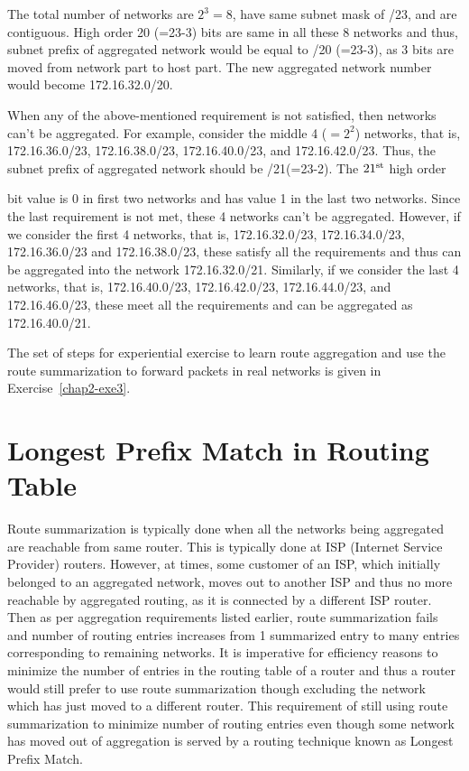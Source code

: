 \begin{multicols}{2}
The total number of networks are $2^{3}=8$, have same subnet mask of /23, and are contiguous. High order 20 (=23-3) bits are same in all these 8 networks and thus, subnet prefix of aggregated network would be equal to /20 (=23-3), as 3 bits are moved from network part to host part. The new aggregated network number would become 172.16.32.0/20.

When any of the above-mentioned requirement is not satisfied, then networks can’t be aggregated. For example, consider the middle 4 ($=2^{2}$) networks, that is, 172.16.36.0/23, 172.16.38.0/23, 172.16.40.0/23, and 172.16.42.0/23. Thus, the subnet prefix of aggregated network should be /21(=23-2). The $21^{\rm st}$ high order

bit value is 0 in first two networks and has value 1 in the last two networks. Since the last requirement is not met, these 4 networks can’t be aggregated. However, if we consider the first 4 networks, that is, 172.16.32.0/23, 172.16.34.0/23, 172.16.36.0/23 and 172.16.38.0/23, these satisfy all the requirements and thus can be aggregated into the network 172.16.32.0/21. Similarly, if we consider the last 4 networks, that is, 172.16.40.0/23, 172.16.42.0/23, 172.16.44.0/23, and 172.16.46.0/23, these meet all the requirements and can be aggregated as 172.16.40.0/21.

The set of steps for experiential exercise to learn route aggregation and use the route summarization to forward packets in real networks is given in Exercise~\ref{chap2-exe3}.

\section{Longest Prefix Match in Routing Table}\label{chap2-sec6}

Route summarization is typically done when all the networks being aggregated are reachable from same router. This is typically done at ISP (Internet Service Provider) routers. However, at times, some customer of an ISP, which initially belonged to an aggregated network, moves out to another ISP and thus no more reachable by aggregated routing, as it is connected by a different ISP router. Then as per aggregation requirements listed earlier, route summarization fails and number of routing entries increases from 1 summarized entry to many entries corresponding to remaining networks. It is imperative for efficiency reasons to minimize the number of entries in the routing table of a router and thus a router would still prefer to use route summarization though excluding the network which has just moved to a different router. This requirement of still using route summarization to minimize number of routing entries even though some network has moved out of aggregation is served by a routing technique known as Longest Prefix Match.


\end{multicols}
